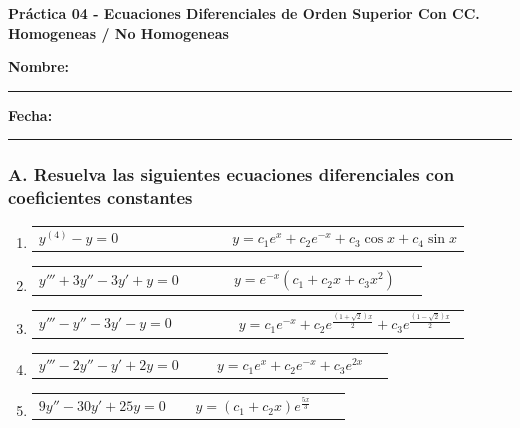 \documentclass[a4paper,12pt]{article}
\begin{document}
\begin{center}
    \Large\textbf{Práctica 04 - Ecuaciones Diferenciales de Orden Superior Con CC. Homogeneas / No Homogeneas}\\[1cm]  

\end{center}
  \textbf{Nombre:} \rule{9cm}{0.4pt}  \textbf{Fecha:} \rule{4.5cm}{0.4pt}

\vspace{0.5cm}

\subsubsection*{A. Resuelva las siguientes ecuaciones diferenciales con coeficientes constantes}
\begin{enumerate}
    \item
    \begin{tabularx}{\linewidth}{L{0.45\linewidth} R{0.45\linewidth}}
    \( y^{(4)} - y = 0 \) & \(\displaystyle y = c_1 e^x + c_2 e^{-x} + c_3 \cos x + c_4 \sin x \)
    \end{tabularx}
    
    \item
    \begin{tabularx}{\linewidth}{L{0.45\linewidth} R{0.45\linewidth}}
    \( y''' + 3y'' - 3y' + y = 0 \) & \(\displaystyle y = e^{-x} (c_1 + c_2 x + c_3 x^2) \)
    \end{tabularx}
    
    \item
    \begin{tabularx}{\linewidth}{L{0.45\linewidth} R{0.45\linewidth}}
    \( y''' - y'' - 3 y' - y = 0 \) & \(\displaystyle y = c_1 e^{-x} + c_2 e^{\frac{(1+\sqrt{2})x}{2}} + c_3 e^{\frac{(1-\sqrt{2})x}{2}} \)
    \end{tabularx}
    
    \item
    \begin{tabularx}{\linewidth}{L{0.45\linewidth} R{0.45\linewidth}}
    \( y''' - 2y'' - y' + 2y = 0 \) & \(\displaystyle y = c_1 e^x + c_2 e^{-x} + c_3 e^{2x} \)
    \end{tabularx}
    
    \item
    \begin{tabularx}{\linewidth}{L{0.45\linewidth} R{0.45\linewidth}}
    \( 9y'' - 30y' + 25y = 0 \) & \(\displaystyle y = (c_1 + c_2 x) e^{\frac{5x}{3}} \)
    \end{tabularx}
    

\end{enumerate}
\end{document}
